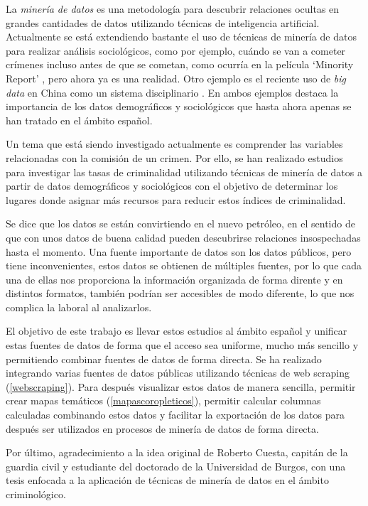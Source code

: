 
La \textit{minería de datos} es una metodología para descubrir relaciones ocultas en grandes cantidades de datos utilizando técnicas de inteligencia artificial. Actualmente se está extendiendo bastante el uso de técnicas de minería de datos para realizar análisis sociológicos, como por ejemplo, cuándo se van a cometer crímenes incluso antes de que se cometan, como ocurría en la película `Minority Report' \cite{movie:minorityreport}, pero ahora ya es una realidad. Otro ejemplo es el reciente uso de \textit{big data} en China como un sistema disciplinario \cite{art:chinabigdata}. En ambos ejemplos destaca la importancia de los datos demográficos y sociológicos que hasta ahora apenas se han tratado en el ámbito español.

Un tema que está siendo investigado actualmente es comprender las variables relacionadas con la comisión de un crimen. Por ello, se han realizado estudios para investigar las tasas de criminalidad utilizando técnicas de minería de datos \cite{art:crimeprediction} \cite{art:crimeprediction2} a partir de datos demográficos y sociológicos con el objetivo de determinar los lugares donde asignar más recursos para reducir estos índices de criminalidad.

Se dice que los datos se están convirtiendo en el nuevo petróleo, en el sentido de que con unos datos de buena calidad pueden descubrirse relaciones insospechadas hasta el momento. Una fuente importante de datos son los datos públicos, pero tiene inconvenientes, estos datos se obtienen de múltiples fuentes, por lo que cada una de ellas nos proporciona la información organizada de forma dirente y en distintos formatos, también podrían ser accesibles de modo diferente, lo que nos complica la laboral al analizarlos.

El objetivo de este trabajo es llevar estos estudios al ámbito español y unificar estas fuentes de datos de forma que el acceso sea uniforme, mucho más sencillo y permitiendo combinar fuentes de datos de forma directa. Se ha realizado integrando varias fuentes de datos públicas utilizando técnicas de web scraping (\ref{webscraping}). Para  después visualizar estos datos de manera sencilla, permitir crear mapas temáticos (\ref{mapascoropleticos}), permitir calcular columnas calculadas combinando estos datos y facilitar la exportación de los datos para después ser utilizados en procesos de minería de datos de forma directa.

Por último, agradecimiento a la idea original de Roberto Cuesta, capitán de la guardia civil y estudiante del doctorado de la Universidad de Burgos, con una tesis enfocada a la aplicación de técnicas de minería de datos en el ámbito criminológico.

